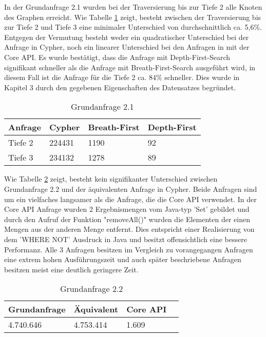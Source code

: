 In der Grundanfrage 2.1 wurden bei der Traversierung bis zur Tiefe 2 alle Knoten des Graphen erreicht. Wie Tabelle \ref{tab:Query2_1} zeigt, besteht zwischen der Traversierung bis zur Tiefe 2 und Tiefe 3  eine minimaler Unterschied von durchschnittlich ca. 5,6\%. Entgegen der Vermutung besteht weder ein quadratischer Unterschied bei der Anfrage in Cypher, noch ein linearer Unterschied bei den Anfragen in mit der Core API. \newline 
Es wurde bestätigt, dass die Anfrage mit Depth-First-Search signifikant schneller als die Anfrage mit Breath-First-Search ausgeführt wird, in diesem Fall ist die Anfrage für die Tiefe 2 ca. 84\% schneller. Dies wurde in Kapitel 3 durch den gegebenen Eigenschaften des Datensatzes begründet. 
\FloatBarrier
\begin{table}[h]
\centering
		\begin{tabular}{ |p{3cm}||p{3cm}|p{3cm}|p{3cm}|  }
			\hline
			Anfrage& Cypher & Breath-First&Depth-First\\
			\hline
			Tiefe 2   & 224431    & 1190&  92\\
			Tiefe 3&    234132  & 1278   & 89\\
			\hline
		\end{tabular}
		\caption{Grundanfrage 2.1}
		\label{tab:Query2_1}
\end{table}
\FloatBarrier
Wie Tabelle \ref{tab:Query2_2} zeigt, besteht kein  signifikanter Unterschied zwischen Grundanfrage 2.2 und der äquivalenten Anfrage in Cypher. Beide Anfragen sind um ein vielfaches langsamer als die Anfrage, die die Core API verwendet. In der Core API Anfrage wurden 2 Ergebnismengen vom Java-typ 'Set' gebildet und durch den Aufruf der Funktion "removeAll()"  wurden die Elementen der einen Mengen aus der anderen Menge entfernt. Dies entspricht einer Realisierung von dem 'WHERE NOT' Ausdruck  in Java und besitzt offensichtlich eine bessere Performanz. Alle 3 Anfragen besitzen im Vergleich zu vorangegangen Anfragen eine extrem hohen Ausführungszeit und auch später beschriebene Anfragen besitzen meist eine deutlich geringere Zeit.
\FloatBarrier
\begin{table}[h]
	\centering
		\begin{tabular}{ |p{3cm}|p{3cm}|p{3cm}|p{3cm}|  }
			\hline
			Grundanfrage & Äquivalent&Core API\\
			\hline
			4.740.646    & 4.753.414 &  1.609\\
			\hline
		\end{tabular}
		\caption{Grundanfrage 2.2}
		\label{tab:Query2_2}
\end{table}
